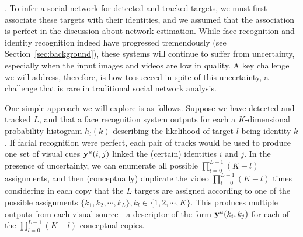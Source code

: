
. To infer a social network for detected and tracked targets, we must first associate these targets with their identities, and we assumed that the association is perfect in the discussion about network estimation. While face recognition and identity recognition indeed have progressed tremendously (see Section~\ref{sec:background}), these systems will continue to suffer from uncertainty, especially when the input images and videos are low in quality. A key challenge we will address, therefore, is how to succeed in spite of this uncertainty, a challenge that is rare in traditional social network analysis.


One simple approach we will explore is as follows. Suppose we have detected and tracked $L$, and that a face recognition system outputs for each a $K$-dimensional probability histogram $h_l(k)$ describing the likelihood of target $l$ being identity $k$. If facial recognition were perfect, each pair of tracks would be used to produce one set of visual cues ${\bf y}^u(i,j)$ linked the (certain) identities $i$ and $j$. In the presence of uncertainty, we can enumerate all possible $\prod_{l=0}^{L-1}(K-l)$ assignments, and then (conceptually) duplicate the video $\prod_{l=0}^{L-1}(K-l)$ times considering in each copy that the $L$ targets are assigned according to one of the possible assignments $\{k_1, k_2, \cdots, k_L\}, k_l\in\{1,2, \cdots, K\}$. This produces multiple outputs from each visual source---a descriptor of the form ${\bf y}^u(k_i,k_j)$ for each of the $\prod_{l=0}^{L-1}(K-l)$ conceptual copies.

